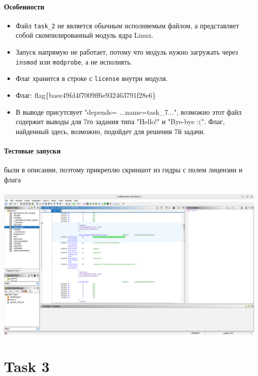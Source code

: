     \noindent

    \paragraph{Особенности}
    \begin{itemize}
        \item Файл \texttt{task\_2} не является обычным исполняемым файлом, а представляет собой скомпилированный модуль ядра Linux.
        \item Запуск напрямую не работает, потому что модуль нужно загружать через \texttt{insmod} или \texttt{modprobe}, а не исполнять.
        \item Флаг хранится в строке с \texttt{license} внутри модуля.
        \item Флаг: flag\{baee49fd4f7009ff6e932463791f28e6\}
        \item В выводе присутсвует "depends= ...name=task\_7...", возможно этот файл содержит выводы для 7го задания типа "Hello!" и "Bye-bye :$($". Флаг, найденный здесь, возможно, подойдет для решения 7й задачи.
    \end{itemize}

    \paragraph{Тестовые запуски} были в описании, поэтому прикреплю скриншот из гидры с полем лицензии и флага

    \paragraph{}
    \includegraphics[width=1\linewidth]{static/solution_task_2.png}


    \section*{Task 3}

